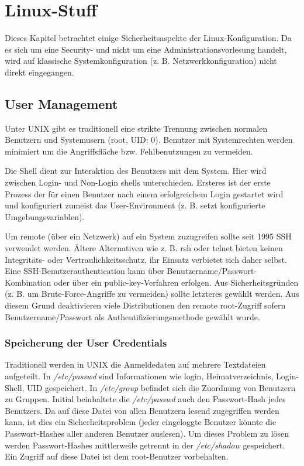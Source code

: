 \part{Linux-Stuff}

Dieses Kapitel betrachtet einige Sicherheitsaspekte der Linux-Konfiguration. Da es sich um eine Security- und nicht um eine Administrationsvorlesung handelt, wird auf klassische Systemkonfiguration (z. B. Netzwerkkonfiguration) nicht direkt eingegangen.  
\chapter{User Management}

Unter UNIX gibt es traditionell eine strikte Trennung zwischen normalen Benutzern und Systemusern (root, UID: 0). Benutzer mit Systemrechten werden minimiert um die Angriffsfläche bzw. Fehlbenutzungen zu vermeiden.

Die Shell dient zur Interaktion des Benutzers mit dem System. Hier wird zwischen Login- und Non-Login shells unterschieden. Ersteres ist der erste Prozess der für einen Benutzer nach einem erfolgreichem Login gestartet wird und konfiguriert zumeist das User-Environment (z. B. setzt konfigurierte Umgebungsvariablen).

Um remote (über ein Netzwerk) auf ein System zuzugreifen sollte seit 1995 SSH verwendet werden. Ältere Alternativen wie z. B. rsh oder telnet bieten keinen Integritäts- oder Vertraulichkeitsschutz, ihr Einsatz verbietet sich daher selbst. Eine SSH-Benutzerauthentication kann über Benutzername/Passwort-Kombination oder über ein public-key-Verfahren erfolgen. Aus Sicherheitsgründen (z. B. um Brute-Force-Angriffe zu vermeiden) sollte letzteres gewählt werden. Aus diesem Grund deaktivieren viele Distributionen den remote root-Zugriff sofern Benutzername/Passwort als Authentifizierungsmethode gewählt wurde.

\section{Speicherung der User Credentials}

Traditionell werden in UNIX die Anmeldedaten auf mehrere Textdateien aufgeteilt. In \textit{/etc/passwd} sind Informationen wie login, Heimatverzeichnis, Login-Shell, UID gespeichert. In \textit{/etc/group} befindet sich die Zuordnung von Benutzern zu Gruppen. Initial beinhaltete die \textit{/etc/passwd} auch den Passwort-Hash jedes Benutzers. Da auf diese Datei von allen Benutzern lesend zugegriffen werden kann, ist dies ein Sicherheitsproblem (jeder eingeloggte Benutzer könnte die Passwort-Hashes aller anderen Benutzer auslesen). Um dieses Problem zu lösen werden Passwort-Hashes mittlerweile getrennt in der \textit{/etc/shadow} gespeichert. Ein Zugriff auf diese Datei ist dem root-Benutzer vorbehalten.

